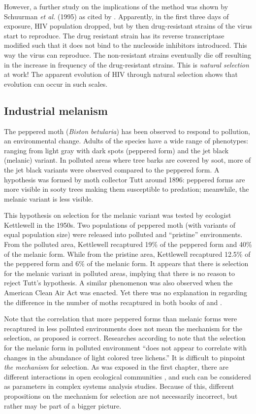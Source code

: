 However, a further study on the implications of the method was shown by Schuurman \textit{et al.} (1995) as cited by .
Apparently, in the first three days of exposure, HIV population dropped, but by then drug-resistant strains of the virus start to reproduce.
The drug resistant strain has its reverse transcriptase modified such that it does not bind to the nucleoside inhibitors introduced.
This way the virus can reproduce.
The non-resistant strains eventually die off resulting in the increase in frequency of the drug-resistant strains.
This is \emph{natural selection} at work!
The apparent evolution of HIV through natural selection shows that evolution can occur in such scales.

\subsection{Industrial melanism} %
The peppered moth (\textit{Biston betularia}) has been observed to respond to pollution, an environmental change.
Adults of the species have a wide range of phenotypes: ranging from light gray with dark spots (peppered form) and the jet black (melanic) variant.
In polluted areas where tree barks are covered by soot, more of the jet black variants were observed compared to the peppered form.
A hypothesis was formed by moth collector Tutt around 1896: peppered forms are more visible in sooty trees making them susceptible to predation; meanwhile, the melanic variant is less visible.

This hypothesis on selection for the melanic variant was tested by ecologist Kettlewell in the 1950s.
Two populations of peppered moth (with variants of equal population size) were released into polluted and ``pristine'' environments.
From the polluted area, Kettlewell recaptured 19\% of the peppered form and 40\% of the melanic form.
While from the pristine area, Kettlewell recaptured 12.5\% of the peppered form and 6\% of the melanic form.
It appears that there is selection for the melanic variant in polluted areas, implying that there is no reason to reject Tutt's hypothesis.
A similar phenomenon was also observed when the American Clean Air Act was enacted.
Yet there was no explanation in regarding the difference in the number of moths recaptured in both books of  and .

Note that the correlation that more peppered forms than melanic forms were recaptured in less polluted environments does not mean the mechanism for the selection, as proposed is correct.
Researches according to  note that the selection for the melanic form in polluted environment ``does not appear to correlate with changes in the abundance of light colored tree lichens.''
It is difficult to pinpoint \emph{the mechanism} for selection.
As was exposed in the first chapter, there are different interactions in open ecological communities \cite{Seibold2018}, and such can be considered as parameters in complex systems analysis studies.
Because of this, different propositions on the mechanism for selection are not necessarily incorrect, but rather may be part of a bigger picture.

